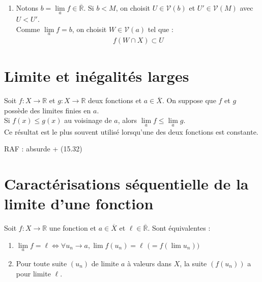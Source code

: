 \documentclass[../main.tex]{subfiles}
\begin{document}
\begin{enumerate}
    \item Notons $b = \lim\limits_a f \in \overline{\mathbb{R}}$. Si $b < M$, on choisit $U \in \mathcal{V}(b)$ et $U' \in \mathcal{V}(M)$ avec $U < U'$. \\
    Comme $\lim\limits_a f = b$, on choisit $W \in \mathcal{V}(a)$ tel que : 
    \begin{align*}
        f(W \cap X) \subset U
    \end{align*}
\end{enumerate}

\section{Limite et inégalités larges}
\begin{tcolorbox}[title=Propostion 15.33, title filled=false, colframe=lightblue, colback=lightblue!10!white]
    Soit $f:X\to \mathbb{R}$ et $g:X\to \mathbb{R}$ deux fonctions et $a \in \overline{X}$. On suppose que $f$ et $g$ possède des limites finies en $a$. \\
    Si $f(x) \leq g(x)$ au voisinage de $a$, alors $\lim\limits_a f \leq \lim\limits_a g$. \\
    Ce résultat est le plus souvent utilisé lorsqu'une des deux fonctions est constante. 
\end{tcolorbox}

RAF : absurde + (15.32)

\section{Caractérisations séquentielle de la limite d'une fonction}
\begin{tcolorbox}[title=Théorème 15.34, title filled=false, colframe=orange, colback=orange!10!white]
    Soit $f:X\to \mathbb{R}$ une fonction et $a \in \overline{X}$ et $\ell \in \overline{\mathbb{R}}$. Sont équivalentes : 
    \begin{enumerate}
        \item $\lim\limits_a f = \ell \Leftrightarrow \forall u_n \to a, \lim f(u_n) = \ell \text{ ($= f(\lim u_n)$)}$
        \item Pour toute suite $(u_n)$ de limite $a$ à valeurs dans $X$, la suite $(f(u_n))$ a pour limite $\ell$. 
    \end{enumerate}
\end{tcolorbox}
\end{document}
